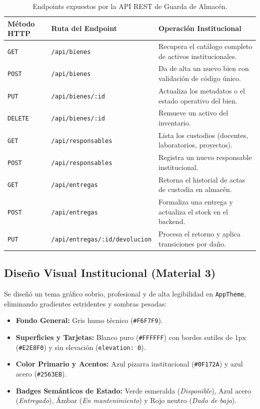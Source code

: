 \documentclass[12pt,a4paper]{article}
\begin{document}
\begin{table}[H]
\centering
\caption{Endpoints expuestos por la API REST de Guarda de Almacén.}
\vspace{0.2cm}
\begin{tabularx}{\textwidth}{|l|l|X|}
\hline
\rowcolor[HTML]{E2E8F0} 
\textbf{Método HTTP} & \textbf{Ruta del Endpoint} & \textbf{Operación Institucional} \\ \hline
\texttt{GET} & \texttt{/api/bienes} & Recupera el catálogo completo de activos institucionales. \\ \hline
\texttt{POST} & \texttt{/api/bienes} & Da de alta un nuevo bien con validación de código único. \\ \hline
\texttt{PUT} & \texttt{/api/bienes/:id} & Actualiza los metadatos o el estado operativo del bien. \\ \hline
\texttt{DELETE} & \texttt{/api/bienes/:id} & Remueve un activo del inventario. \\ \hline
\texttt{GET} & \texttt{/api/responsables} & Lista los custodios (docentes, laboratorios, proyectos). \\ \hline
\texttt{POST} & \texttt{/api/responsables} & Registra un nuevo responsable institucional. \\ \hline
\texttt{GET} & \texttt{/api/entregas} & Retorna el historial de actas de custodia en almacén. \\ \hline
\texttt{POST} & \texttt{/api/entregas} & Formaliza una entrega y actualiza el stock en el backend. \\ \hline
\texttt{PUT} & \texttt{/api/entregas/:id/devolucion} & Procesa el retorno y aplica transiciones por daño. \\ \hline
\end{tabularx}
\end{table}

\subsection{Diseño Visual Institucional (Material 3)}
Se diseñó un tema gráfico sobrio, profesional y de alta legibilidad en \texttt{AppTheme}, eliminando gradientes estridentes y sombras pesadas:
\begin{itemize}
    \item \textbf{Fondo General:} Gris humo técnico (\texttt{\#F6F7F9}).
    \item \textbf{Superficies y Tarjetas:} Blanco puro (\texttt{\#FFFFFF}) con bordes sutiles de $1\text{px}$ (\texttt{\#E2E8F0}) y sin elevación (\texttt{elevation: 0}).
    \item \textbf{Color Primario y Acentos:} Azul pizarra institucional (\texttt{\#0F172A}) y azul acero (\texttt{\#2563EB}).
    \item \textbf{Badges Semánticos de Estado:} Verde esmeralda (\textit{Disponible}), Azul acero (\textit{Entregado}), Ámbar (\textit{En mantenimiento}) y Rojo neutro (\textit{Dado de baja}).
\end{itemize}
\end{document}
